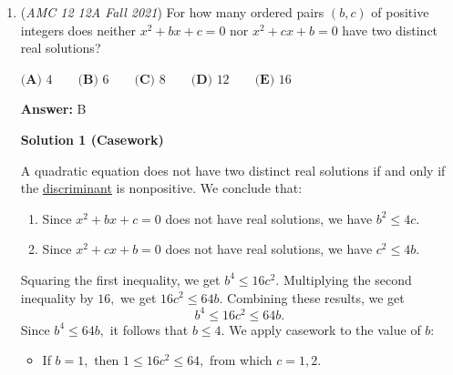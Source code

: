 \begin{enumerate}
\begin{enumerate}
\begin{itemize}
        \item Between $B_i$ and $B_j,$ where $i,j\in\{1,2,\ldots,10\}$ and $i\neq j$The relay is $B_i\leftrightarrow \{A_1, A_2, \ldots, A_{11}\}\leftrightarrow B_j.$

        \item Between $A_i$ and $B_j,$ where $i\in\{1,2,\ldots,20\}$ and $j\in\{1,2,\ldots,10\}$The relay is $A_i\leftrightarrow B_1\leftrightarrow \{A_1, A_2, \ldots, A_{11}\}\leftrightarrow B_j.$

            \end{itemize}
            
            \end{enumerate}
            


	\item (\textit{AMC 12 12A Fall 2021}) For how many ordered pairs $(b,c)$ of positive integers does neither $x^2+bx+c=0$ nor $x^2+cx+b=0$ have two distinct real solutions?


 $\textbf{(A) } 4 \qquad \textbf{(B) } 6 \qquad \textbf{(C) } 8 \qquad \textbf{(D) } 12 \qquad \textbf{(E) } 16 \qquad$

 \textbf{Answer: }B



\textbf{Solution 1 (Casework)}

A quadratic equation does not have two distinct real solutions if and only if the \href{https://artofproblemsolving.com/wiki/index.php?title=Discriminant}{discriminant} is nonpositive. We conclude that:

 
            \begin{enumerate} 
        \item Since $x^2+bx+c=0$ does not have real solutions, we have $b^2\leq 4c.$

        \item Since $x^2+cx+b=0$ does not have real solutions, we have $c^2\leq 4b.$

            \end{enumerate}
            Squaring the first inequality, we get $b^4\leq 16c^2.$ Multiplying the second inequality by $16,$ we get $16c^2\leq 64b.$ Combining these results, we get 
 \[b^4\leq 16c^2\leq 64b.\]Since $b^4\leq 64b,$ it follows that $b\leq4.$ We apply casework to the value of $b:$

            \begin{itemize}
        \item If $b=1,$ then $1\leq 16c^2\leq 64,$ from which $c=1,2.$
            \end{itemize}
            

\end{enumerate}
